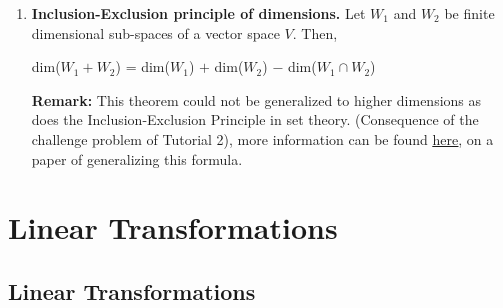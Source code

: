 \documentclass[oneside, 12pt]{book}
\newcommand{\settag}[1]{\renewcommand{\theenumi}{#1}}
\newcommand{\tbf}[1]{\textbf{#1}}
\begin{document}
\begin{enumerate}
        
        \settag{1.6.18}
        \item \tbf{Inclusion-Exclusion principle of dimensions.} Let $W_1$ and $W_2$ be finite dimensional 
        sub-spaces of a vector space $V$. Then,
        \begin{center}
            dim($W_1+W_2$) = dim($W_1$) $+$ dim($W_2$) $-$ dim($W_1\cap W_2$)
        \end{center}
        \tbf{Remark:} This theorem could not be generalized to higher dimensions as does the 
        Inclusion-Exclusion Principle in set theory. (Consequence of the challenge problem of Tutorial 2), 
        more information can be found \href{https://www.jstor.org/stable/24337937?seq=1#metadata_info_tab_contents}{\underline{here}}, on a paper of generalizing this formula. 
        
    \end{enumerate}
    
\chapter{Linear Transformations}
\section{Linear Transformations}
\end{document}
